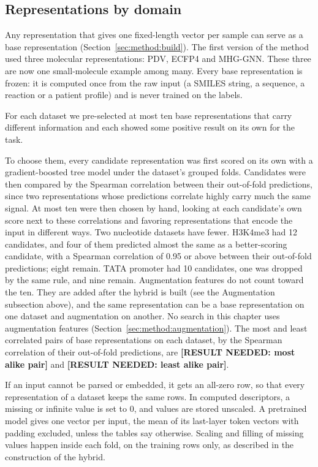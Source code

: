 \subsection{Representations by domain}\label{sec:method:reps}

Any representation that gives one fixed-length vector per sample can serve as a base representation (Section~\ref{sec:method:build}). The first version of the method used three molecular representations: PDV, ECFP4 and MHG-GNN. These three are now one small-molecule example among many. Every base representation is frozen: it is computed once from the raw input (a SMILES string, a sequence, a reaction or a patient profile) and is never trained on the labels.

For each dataset we pre-selected at most ten base representations that carry different information and each showed some positive result on its own for the task.

To choose them, every candidate representation was first scored on its own with a gradient-boosted tree model \citep{ke2017lightgbm} under the dataset's grouped folds. Candidates were then compared by the Spearman correlation between their out-of-fold predictions, since two representations whose predictions correlate highly carry much the same signal. At most ten were then chosen by hand, looking at each candidate's own score next to these correlations and favoring representations that encode the input in different ways. Two nucleotide datasets have fewer. H3K4me3 had 12 candidates, and four of them predicted almost the same as a better-scoring candidate, with a Spearman correlation of 0.95 or above between their out-of-fold predictions; eight remain. TATA promoter had 10 candidates, one was dropped by the same rule, and nine remain. Augmentation features do not count toward the ten. They are added after the hybrid is built (see the Augmentation subsection above), and the same representation can be a base representation on one dataset and augmentation on another. No search in this chapter uses augmentation features (Section~\ref{sec:method:augmentation}).
The most and least correlated pairs of base representations on each dataset, by the Spearman correlation of their out-of-fold predictions, are \textbf{[RESULT NEEDED: most alike pair]} and \textbf{[RESULT NEEDED: least alike pair]}.

If an input cannot be parsed or embedded, it gets an all-zero row, so that every representation of a dataset keeps the same rows. In computed descriptors, a missing or infinite value is set to 0, and values are stored unscaled. A pretrained model gives one vector per input, the mean of its last-layer token vectors with padding excluded, unless the tables say otherwise. Scaling and filling of missing values happen inside each fold, on the training rows only, as described in the construction of the hybrid.

